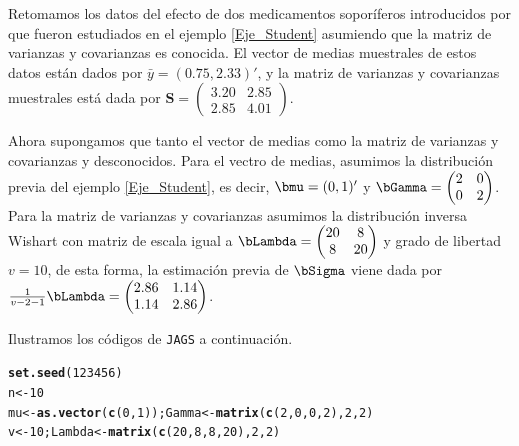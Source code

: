 \documentclass[10pt,openright]{book}\usepackage[]{graphicx}\usepackage[]{color}
\makeatletter
\newcommand{\hlnum}[1]{\textcolor[rgb]{0.686,0.059,0.569}{#1}}%
\newcommand{\hlstd}[1]{\textcolor[rgb]{0.345,0.345,0.345}{#1}}%
\newcommand{\hlkwb}[1]{\textcolor[rgb]{0.69,0.353,0.396}{#1}}%
\newcommand{\hlkwd}[1]{\textcolor[rgb]{0.737,0.353,0.396}{\textbf{#1}}}%
\newenvironment{kframe}{%
 \def\at@end@of@kframe{}%
 \ifinner\ifhmode%
  \def\at@end@of@kframe{\end{minipage}}%
  \begin{minipage}{\columnwidth}%
 \fi\fi%
 \def\FrameCommand##1{\hskip\@totalleftmargin \hskip-\fboxsep
 \colorbox{shadecolor}{##1}\hskip-\fboxsep
     \hskip-\linewidth \hskip-\@totalleftmargin \hskip\columnwidth}%
 \MakeFramed {\advance\hsize-\width
   \@totalleftmargin\z@ \linewidth\hsize
   \@setminipage}}%
 {\par\unskip\endMakeFramed%
 \at@end@of@kframe}
\newenvironment{knitrout}{}{} %
\makeatother
\begin{document}
\begin{Eje}\label{Eje_Student_2}
Retomamos los datos del efecto de dos medicamentos sopor\'iferos introducidos por  que fueron estudiados en el ejemplo \ref{Eje_Student} asumiendo que la matriz de varianzas y covarianzas es conocida. El vector de medias muestrales de estos datos est\'an dados por $\bar{y}=(0.75, 2.33)'$, y la matriz de varianzas y covarianzas muestrales est\'a dada por $\mathbf{S}=\begin{pmatrix}3.20&2.85\\2.85&4.01\end{pmatrix}$. 

Ahora supongamos que tanto el vector de medias como la matriz de varianzas y covarianzas y desconocidos. Para el vectro de medias, asumimos la distribuci\'on previa del ejemplo \ref{Eje_Student}, es decir, $\bmu=(0,1)'$ y $\bGamma=\begin{pmatrix}2&0\\0&2\end{pmatrix}$. Para la matriz de varianzas y covarianzas asumimos la distribuci\'on inversa Wishart con matriz de escala igual a $\bLambda=\begin{pmatrix}20&8\\8&20\end{pmatrix}$ y grado de libertad $v=10$, de esta forma, la estimaci\'on previa de $\bSigma$ viene dada por $\frac{1}{v-2-1}\bLambda=\begin{pmatrix}2.86&1.14\\ 1.14&2.86\end{pmatrix}$. 

Ilustramos los c\'odigos de \verb'JAGS' a continuaci\'on.

\begin{knitrout}
\color{fgcolor}\begin{kframe}
\begin{alltt}
\hlkwd{set.seed}\hlstd{(}\hlnum{123456}\hlstd{)}
\hlstd{n} \hlkwb{<-} \hlnum{10}
\hlstd{mu}\hlkwb{<-} \hlkwd{as.vector}\hlstd{(}\hlkwd{c}\hlstd{(}\hlnum{0}\hlstd{,}\hlnum{1}\hlstd{)); Gamma} \hlkwb{<-} \hlkwd{matrix}\hlstd{(}\hlkwd{c}\hlstd{(}\hlnum{2}\hlstd{,}\hlnum{0}\hlstd{,}\hlnum{0}\hlstd{,}\hlnum{2}\hlstd{),}\hlnum{2}\hlstd{,}\hlnum{2}\hlstd{)}
\hlstd{v} \hlkwb{<-} \hlnum{10}\hlstd{; Lambda} \hlkwb{<-} \hlkwd{matrix}\hlstd{(}\hlkwd{c}\hlstd{(}\hlnum{20}\hlstd{,}\hlnum{8}\hlstd{,}\hlnum{8}\hlstd{,}\hlnum{20}\hlstd{),}\hlnum{2}\hlstd{,}\hlnum{2}\hlstd{)}


\end{alltt}
\end{kframe}
\end{knitrout}
\end{Eje}
\end{document}
